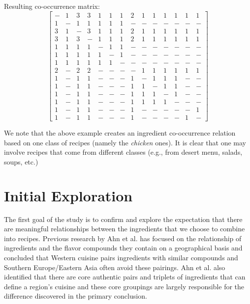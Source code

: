 \documentclass[conference]{IEEEtran}
\begin{document}
\vspace{.5cm}
Resulting co-occurrence matrix:
$$
   \begin{bmatrix}
      - & 1 & 3 & 3 & 1 & 1 & 1 & 2 & 1 & 1 & 1  & 1  & 1  & 1  \\
      1 & - & 1 & 1 & 1 & 1 & 1 & - & - & - & -  & -  & -  & -  \\
      3 & 1 & - & 3 & 1 & 1 & 1 & 2 & 1 & 1 & 1  & 1  & 1  & 1  \\
      3 & 1 & 3 & - & 1 & 1 & 1 & 2 & 1 & 1 & 1  & 1  & 1  & 1  \\
      1 & 1 & 1 & 1 & - & 1 & 1 & - & - & - & -  & -  & -  & -  \\
      1 & 1 & 1 & 1 & 1 & - & 1 & - & - & - & -  & -  & -  & -  \\
      1 & 1 & 1 & 1 & 1 & 1 & - & - & - & - & -  & -  & -  & -  \\
      2 & - & 2 & 2 & - & - & - & - & 1 & 1 & 1  & 1  & 1  & 1  \\
      1 & - & 1 & 1 & - & - & - & 1 & - & 1 & 1  & 1  & -  & -  \\
      1 & - & 1 & 1 & - & - & - & 1 & 1 & - & 1  & 1  & -  & -  \\
      1 & - & 1 & 1 & - & - & - & 1 & 1 & 1 & -  & 1  & -  & -  \\
      1 & - & 1 & 1 & - & - & - & 1 & 1 & 1 & 1  & -  & -  & -  \\
      1 & - & 1 & 1 & - & - & - & 1 & - & - & -  & -  & -  & 1  \\
      1 & - & 1 & 1 & - & - & - & 1 & - & - & -  & -  & 1  & -
   \end{bmatrix}
$$

We note that the above example creates an ingredient co-occurrence relation based on one class of recipes (namely the {\em chicken} ones).
It is clear that one may involve recipes that come from different classes (e.g., from desert menu, salads, soups, etc.)

\section{Initial Exploration}
The first goal of the study is to confirm and explore the expectation that there are meaningful
relationships between the ingredients that we choose to combine into recipes. Previous research
by Ahn et al.  \cite{Ahn11} has focused on the relationship of ingredients and the flavor compounds
they contain on a geographical basis and concluded that Western cuisine pairs ingredients with
similar compounds and Southern Europe/Eastern Asia often avoid these pairings. Ahn et al. also
identified that there are core authentic pairs and triplets of ingredients that can define a
region's cuisine and these core groupings are largely responsible for the difference discovered
in the primary conclusion.
\end{document}
